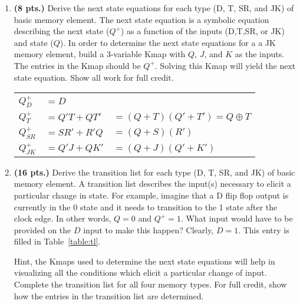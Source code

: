 \begin{enumerate}
    \item \textbf{ (8 pts.)} Derive the next state equations for each
        type (D, T, SR, and JK) of basic memory element.  The next state equation
        is a symbolic equation describing the next state ($Q^+$)
        as a function of the inputs (D,T,SR, or JK) and state ($Q$).
        In order to determine the next state equations for a
        a JK memory element, build a 3-variable Kmap with
        $Q$, $J$, and $K$ as the inputs.  The entries in the Kmap should
        be $Q^+$.  Solving this Kmap will yield the next state equation.
        Show all work for full credit.
        \begin{onlysolution}
            \begin{figure}[ht]
                \caption{}
            \end{figure}
            {\color{blue}\addtolength{\tabcolsep}{-0.4em}
                \begin{tabular}{*{3}{l}}
                    $Q^+_D   $   &$= D         $& ~                              \\[0.1em]
                    $Q^+_T   $   &$= Q'T + QT' $&$= (Q+T)(Q'+T') = Q\oplus T$    \\[0.1em]
                    $Q^+_{SR}$   &$= SR'+R'Q   $&$= (Q+S)(R')   $                \\[0.1em]
                    $Q^+_{JK}$   &$= Q'J + QK' $&$= (Q+J)(Q'+K')$
            \end{tabular}}
        \end{onlysolution}
    \item \textbf{ (16 pts.)} Derive the transition list for each
        type (D, T, SR, and JK) of basic memory element.  A transition
        list describes the input(s) necessary to elicit a particular
        change in state.  For example, imagine that a D flip flop output
        is currently in the 0 state and it needs to transition to
        the 1 state after the clock edge.  In other words, $Q=0$ and
        $Q^+ = 1$.  What input would have to be provided on the
        $D$ input to make this happen?  Clearly, $D=1$.  This entry
        is filled in Table~\ref{table:tl}.

        Hint, the Kmaps used to determine the next state equations
        will help in visualizing all the conditions which elicit
        a particular change of input.  Complete the transition list
        for all four memory types.  For full credit, show how the
        entries in the transition list are determined.


\end{enumerate}
